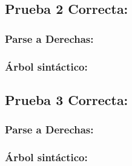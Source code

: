 \documentclass[a4paper, 12pt]{article}
\begin{document}
\subsection*{Prueba 2 Correcta:}

\subsubsection*{Parse a Derechas:}

\subsubsection*{Árbol sintáctico:}


\subsection*{Prueba 3 Correcta:}

\subsubsection*{Parse a Derechas:}

\subsubsection*{Árbol sintáctico:}
\end{document}
